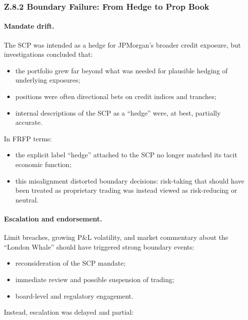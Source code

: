 \subsubsection*{Z.8.2 Boundary Failure: From Hedge to Prop Book}

\paragraph{Mandate drift.}
The SCP was intended as a hedge for JPMorgan’s broader credit exposure, but
investigations concluded that:

\begin{itemize}
  \item the portfolio grew far beyond what was needed for plausible hedging
        of underlying exposures;
  \item positions were often directional bets on credit indices and tranches;
  \item internal descriptions of the SCP as a ``hedge'' were, at best,
        partially accurate.
\end{itemize}

In FRFP terms:

\begin{itemize}
  \item the explicit label ``hedge'' attached to the SCP no longer matched
        its tacit economic function;
  \item this misalignment distorted boundary decisions:
        risk-taking that should have been treated as proprietary trading was
        instead viewed as risk-reducing or neutral.
\end{itemize}

\paragraph{Escalation and endorsement.}
Limit breaches, growing P\&L volatility, and market commentary about the
``London Whale'' should have triggered strong boundary events:

\begin{itemize}
  \item reconsideration of the SCP mandate;
  \item immediate review and possible suspension of trading;
  \item board-level and regulatory engagement.
\end{itemize}

Instead, escalation was delayed and partial:

